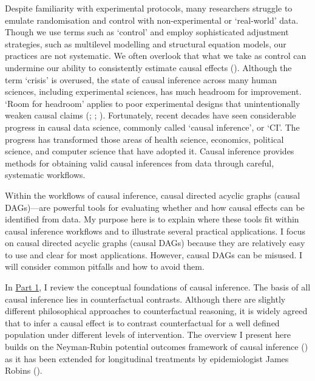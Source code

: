 \documentclass[
  single column]{article}
\begin{document}
Despite familiarity with experimental protocols, many researchers
struggle to emulate randomisation and control with non-experimental or
`real-world' data. Though we use terms such as `control' and employ
sophisticated adjustment strategies, such as multilevel modelling and
structural equation models, our practices are not systematic. We often
overlook that what we take as control can undermine our ability to
consistently estimate causal effects
(). Although the
term `crisis' is overused, the state of causal inference across many
human sciences, including experimental sciences, has much headroom for
improvement. `Room for headroom' applies to poor experimental designs
that unintentionally weaken causal claims
(;
;
). Fortunately,
recent decades have seen considerable progress in causal data science,
commonly called `causal inference', or `CI'. The progress has
transformed those areas of health science, economics, political science,
and computer science that have adopted it. Causal inference provides
methods for obtaining valid causal inferences from data through careful,
systematic workflows.

Within the workflows of causal inference, causal directed acyclic graphs
(causal DAGs)---are powerful tools for evaluating whether and how causal
effects can be identified from data. My purpose here is to explain where
these tools fit within causal inference workflows and to illustrate
several practical applications. I focus on causal directed acyclic
graphs (causal DAGs) because they are relatively easy to use and clear
for most applications. However, causal DAGs can be misused. I will
consider common pitfalls and how to avoid them.

In \hyperref[id-sec-1]{Part 1}, I review the conceptual foundations of
causal inference. The basis of all causal inference lies in
counterfactual contrasts. Although there are slightly different
philosophical approaches to counterfactual reasoning, it is widely
agreed that to infer a causal effect is to contrast counterfactual for a
well defined population under different levels of intervention. The
overview I present here builds on the Neyman-Rubin potential outcomes
framework of causal inference () as it has been extended for longitudinal treatments by
epidemiologist James Robins ().
\end{document}
